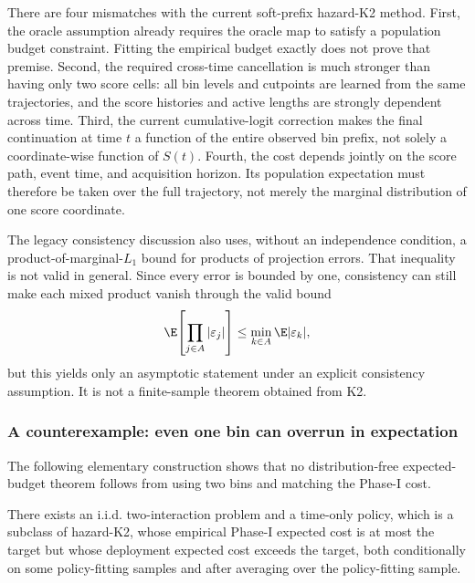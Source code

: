 There are four mismatches with the current soft-prefix hazard-K2 method.
First, the oracle assumption already requires the oracle map to satisfy a
population budget constraint.  Fitting the empirical budget exactly does not
prove that premise.  Second, the required cross-time cancellation is much
stronger than having only two score cells: all bin levels and cutpoints are
learned from the same trajectories, and the score histories and active lengths
are strongly dependent across time.  Third, the current cumulative-logit
correction makes the final continuation at time $t$ a function of the entire
observed bin prefix, not solely a coordinate-wise function of $S(t)$.  Fourth,
the cost depends jointly on the score path, event time, and acquisition
horizon.  Its population expectation must therefore be taken over the full
trajectory, not merely the marginal distribution of one score coordinate.

The legacy consistency discussion also uses, without an independence
condition, a product-of-marginal-$L_1$ bound for products of projection
errors.  That inequality is not valid in general.  Since every error is
bounded by one, consistency can still make each mixed product vanish through
the valid bound
\begin{equation}
    \E\!\left[\prod_{j\in A}|\varepsilon_j|\right]
    \leq \min_{k\in A}\E|\varepsilon_k|,
\end{equation}
but this yields only an asymptotic statement under an explicit consistency
assumption.  It is not a finite-sample theorem obtained from K2.

\subsubsection{A counterexample: even one bin can overrun in expectation}

The following elementary construction shows that no distribution-free
expected-budget theorem follows from using two bins and matching the Phase-I
cost.

\begin{proposition}
\label{prop:k2bc_counterexample}
There exists an i.i.d. two-interaction problem and a time-only policy, which is
a subclass of hazard-K2, whose empirical Phase-I expected cost is at most the
target but whose deployment expected cost exceeds the target, both
conditionally on some policy-fitting samples and after averaging over the
policy-fitting sample.
\end{proposition}

